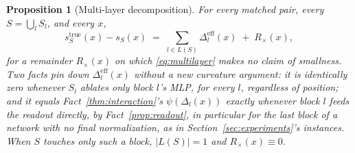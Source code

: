 \documentclass[11pt,a4paper]{article}
\newtheorem{proposition}{Proposition}
\begin{document}
\begin{proposition}[Multi-layer decomposition]
\label{prop:multilayer}
For every matched pair, every $S=\bigcup_l S_l$, and every $x$,
\begin{equation}
\label{eq:multilayer}
s_S^{\mathrm{true}}(x) - s_S(x) \;=\; \sum_{l\in L(S)} \Delta_l^{\mathrm{eff}}(x) \;+\; R_\times(x),
\end{equation}
for a remainder $R_\times(x)$ on which \eqref{eq:multilayer} makes no claim
of smallness. Two facts pin down $\Delta_l^{\mathrm{eff}}(x)$ without a new
curvature argument: it is \emph{identically zero} whenever $S_l$ ablates only
block $l$'s MLP, for every $l$, regardless of position; and it equals
Fact~\ref{thm:interaction}'s $\psi(\Delta_l(x))$ exactly whenever block $l$
feeds the readout directly, by Fact~\ref{prop:readout}, in
particular for the last block of a network with no final normalization, as
in Section~\ref{sec:experiments}'s instances. When $S$ touches only such a
block, $|L(S)|=1$ and $R_\times(x)\equiv0$.
\end{proposition}
\end{document}
